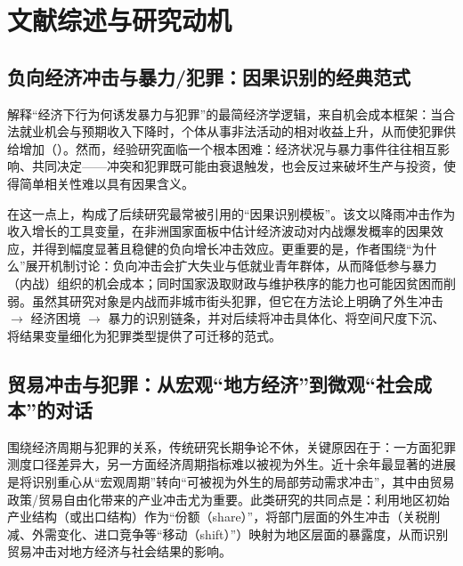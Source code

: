 
\section{文献综述与研究动机}
\label{sec:lit_motivation_cn}

\subsection{负向经济冲击与暴力/犯罪：因果识别的经典范式}
\label{subsec:econ_shocks_crime_cn}

解释“经济下行为何诱发暴力与犯罪”的最简经济学逻辑，来自机会成本框架：当合法就业机会与预期收入下降时，个体从事非法活动的相对收益上升，从而使犯罪供给增加（\citealp{becker1968crime}）。然而，经验研究面临一个根本困难：经济状况与暴力事件往往相互影响、共同决定——冲突和犯罪既可能由衰退触发，也会反过来破坏生产与投资，使得简单相关性难以具有因果含义。

在这一点上，\citet{miguel2004economic}构成了后续研究最常被引用的“因果识别模板”。该文以降雨冲击作为收入增长的工具变量，在非洲国家面板中估计经济波动对内战爆发概率的因果效应，并得到幅度显著且稳健的负向增长冲击效应。更重要的是，作者围绕“为什么”展开机制讨论：负向冲击会扩大失业与低就业青年群体，从而降低参与暴力（内战）组织的机会成本；同时国家汲取财政与维护秩序的能力也可能因贫困而削弱。虽然其研究对象是内战而非城市街头犯罪，但它在方法论上明确了外生冲击 $\rightarrow$ 经济困境 $\rightarrow$ 暴力的识别链条，并对后续将冲击具体化、将空间尺度下沉、将结果变量细化为犯罪类型提供了可迁移的范式。

\subsection{贸易冲击与犯罪：从宏观“地方经济”到微观“社会成本”的对话}
\label{subsec:trade_crime_cn}

围绕经济周期与犯罪的关系，传统研究长期争论不休，关键原因在于：一方面犯罪测度口径差异大，另一方面经济周期指标难以被视为外生。近十余年最显著的进展是将识别重心从“宏观周期”转向“可被视为外生的局部劳动需求冲击”，其中由贸易政策/贸易自由化带来的产业冲击尤为重要。此类研究的共同点是：利用地区初始产业结构（或出口结构）作为“份额（share）”，将部门层面的外生冲击（关税削减、外需变化、进口竞争等“移动（shift）”）映射为地区层面的暴露度，从而识别贸易冲击对地方经济与社会结果的影响。

